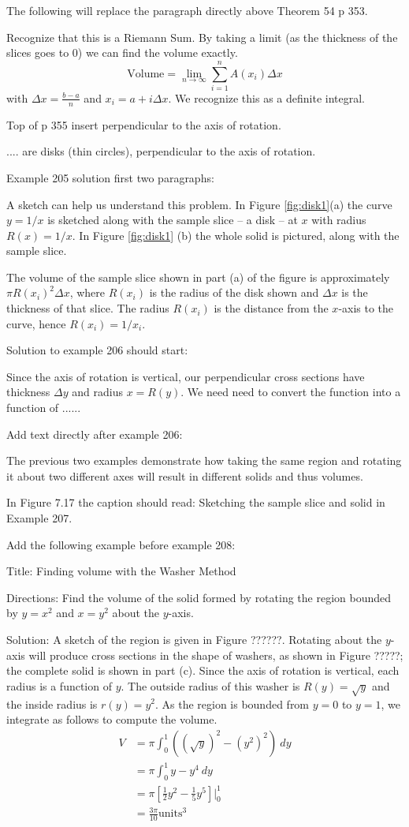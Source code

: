 \documentclass[10pt]{article}
\begin{document}
The following will replace the paragraph directly above Theorem 54 p 353.


Recognize that this is a Riemann Sum. By taking a limit (as the thickness of the slices goes to 0) we can find the volume exactly. 
 $$\text{Volume}=\lim_{n\to \infty} \sum_{i=1}^n A(x_i)\Delta x$$ with 
$\Delta x=\frac{b-a}{n}$ and $x_i=a+i\Delta x$. We recognize this as a definite integral. 

Top of p 355 insert perpendicular to the axis of rotation.

.... are disks (thin circles), perpendicular to the axis of rotation.  


Example 205 solution first two paragraphs:

A sketch can help us understand this problem. In Figure \ref{fig:disk1}(a) the curve $y=1/x$ is sketched along with the sample slice -- a disk -- at $x$ with radius $R(x)=1/x$. In Figure \ref{fig:disk1} (b) the whole solid is pictured, along with the sample slice. 

The volume of the sample slice shown in part (a) of the figure is approximately $\pi R(x_i)^2\Delta x$, where $R(x_i)$ is the radius of the disk shown and $\Delta x$ is the thickness of that slice. The radius $R(x_i)$ is the distance from the $x$-axis to the curve, hence $R(x_i) = 1/x_i$.

Solution to example 206 should start:

Since the axis of rotation is vertical, our perpendicular cross sections have thickness $\Delta y$ and radius $x=R(y)$. We need need to convert the function into a function of ......

Add text directly after example 206:

The previous two examples demonstrate how taking the same region and rotating it about two different axes will result in different solids and thus volumes.

In Figure 7.17 the caption should read:   Sketching the sample slice and solid in Example 207.


Add the following example before example 208:

Title: Finding volume with the Washer Method

Directions: Find the volume of the solid formed by rotating the region bounded by $y=x^2$ and $x=y^2$ about the $y$-axis.

Solution: A sketch of the region is given in Figure ??????. Rotating about the $y$-axis will produce cross sections in the shape of washers, as shown in Figure ?????; the complete solid is shown in  part (c). Since the axis of rotation is vertical, each radius is a function of $y$. The outside radius of this washer is $R(y)=\sqrt y$ and the inside radius is $r(y)=y^2$. As the region is bounded from $y=0$ to $y=1$, we integrate as follows to compute the volume. 
\begin{align*}
V&=\pi \int_0^1 \left((\sqrt y)^2-(y^2)^2\right) ~dy\\
&=\pi \int_0^1 y-y^4 ~dy\\
&=\pi\left[\frac{1}{2} y^2-\frac{1}{5} y^5\right] \Big|_0^1\\
&=\frac{3\pi}{10} \text{units}^3
\end{align*}
\end{document}
